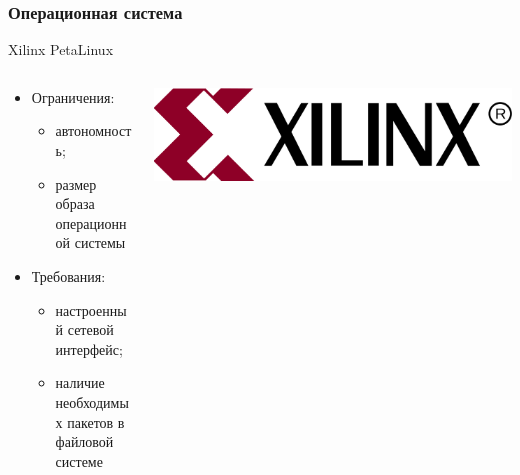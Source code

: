 \documentclass[aspectratio=169]{beamer}
\begin{document}
\begin{frame}
\frametitle{Операционная система}
Xilinx PetaLinux \\   
    \begin{columns}
        \begin{column}{0.8\textwidth}
            \begin{itemize}
                \item Ограничения:
                \begin{itemize}
                    \item автономность;
                    \item размер образа операционной системы
                \end{itemize}
                \item Требования:
                \begin{itemize}
                    \item настроенный сетевой интерфейс;
                    \item наличие необходимых пакетов в файловой системе
                \end{itemize}
            \end{itemize}
        \end{column}
        \begin{column}{0.2\textwidth}
            \includegraphics[width=\textwidth]{Xilinx.jpg}
        \end{column}
    \end{columns}
\end{frame}
\end{document}
